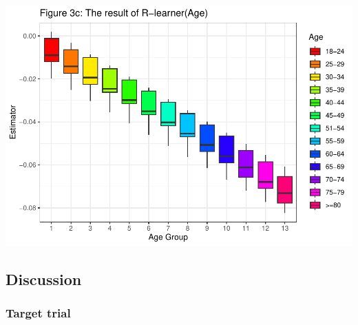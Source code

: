\documentclass[
  12pt,
]{article}
\begin{document}
\includegraphics{template_files/figure-latex/unnamed-chunk-8-3.pdf}

\hypertarget{discussion}{%
\subsection{Discussion}\label{discussion}}

\hypertarget{target-trial}{%
\subsubsection{Target trial}\label{target-trial}}
\end{document}
